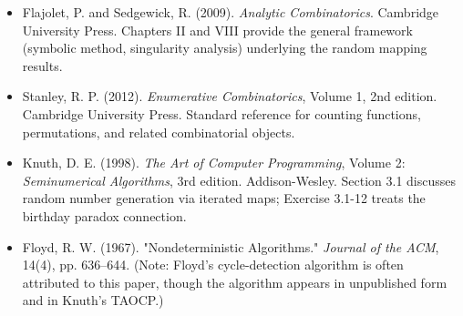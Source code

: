 \begin{itemize}
  \item Flajolet, P. and Sedgewick, R. (2009). \textit{Analytic Combinatorics}. Cambridge University Press. Chapters II and VIII provide the general framework (symbolic method, singularity analysis) underlying the random mapping results.
\end{itemize}

\begin{itemize}
  \item Stanley, R. P. (2012). \textit{Enumerative Combinatorics}, Volume 1, 2nd edition. Cambridge University Press. Standard reference for counting functions, permutations, and related combinatorial objects.
\end{itemize}

\begin{itemize}
  \item Knuth, D. E. (1998). \textit{The Art of Computer Programming}, Volume 2: \textit{Seminumerical Algorithms}, 3rd edition. Addison-Wesley. Section 3.1 discusses random number generation via iterated maps; Exercise 3.1-12 treats the birthday paradox connection.
\end{itemize}

\begin{itemize}
  \item Floyd, R. W. (1967). "Nondeterministic Algorithms." \textit{Journal of the ACM}, 14(4), pp. 636--644. (Note: Floyd's cycle-detection algorithm is often attributed to this paper, though the algorithm appears in unpublished form and in Knuth's TAOCP.)
\end{itemize}
